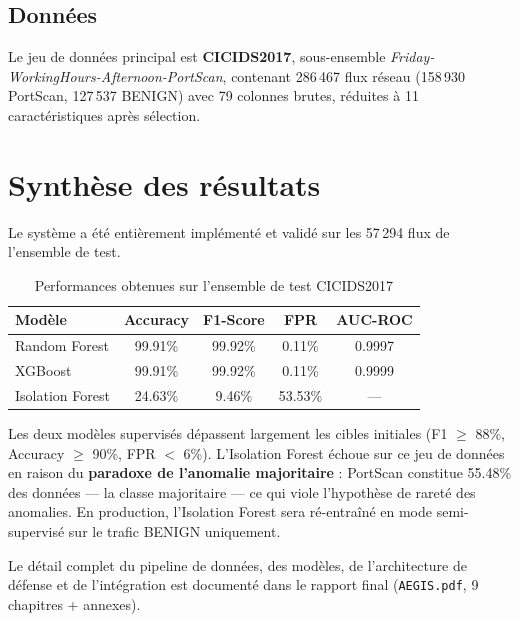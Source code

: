 \documentclass[12pt,a4paper]{article}
\begin{document}
\subsection{Donn\'{e}es}

Le jeu de donn\'{e}es principal est \textbf{CICIDS2017}, sous-ensemble
\textit{Friday-WorkingHours-Afternoon-PortScan}, contenant 286\,467 flux r\'{e}seau
(158\,930 PortScan, 127\,537 BENIGN) avec 79 colonnes brutes, r\'{e}duites \`{a}
11 caract\'{e}ristiques apr\`{e}s s\'{e}lection.

\section{Synth\`{e}se des r\'{e}sultats}

Le syst\`{e}me a \'{e}t\'{e} enti\`{e}rement impl\'{e}ment\'{e} et valid\'{e} sur
les 57\,294 flux de l'ensemble de test.

\begin{table}[h!]
\centering
\caption{Performances obtenues sur l'ensemble de test CICIDS2017}
\begin{tabular}{lcccc}
\toprule
\textbf{Mod\`{e}le} & \textbf{Accuracy} & \textbf{F1-Score} & \textbf{FPR} & \textbf{AUC-ROC} \\
\midrule
Random Forest & 99.91\% & 99.92\% & 0.11\% & 0.9997 \\
XGBoost       & 99.91\% & 99.92\% & 0.11\% & 0.9999 \\
Isolation Forest & 24.63\% & 9.46\% & 53.53\% & --- \\
\bottomrule
\end{tabular}
\end{table}

\noindent Les deux mod\`{e}les supervis\'{e}s d\'{e}passent largement les cibles initiales
(F1 $\geq$ 88\%, Accuracy $\geq$ 90\%, FPR $<$ 6\%). L'Isolation Forest \'{e}choue
sur ce jeu de donn\'{e}es en raison du \textbf{paradoxe de l'anomalie majoritaire} :
PortScan constitue 55.48\% des donn\'{e}es --- la classe majoritaire --- ce qui viole
l'hypoth\`{e}se de raret\'{e} des anomalies. En production, l'Isolation Forest sera
r\'{e}-entra\^{i}n\'{e} en mode semi-supervis\'{e} sur le trafic BENIGN uniquement.

Le d\'{e}tail complet du pipeline de donn\'{e}es, des mod\`{e}les, de l'architecture
de d\'{e}fense et de l'int\'{e}gration est document\'{e} dans le rapport final
(\texttt{AEGIS.pdf}, 9 chapitres + annexes).
\end{document}

